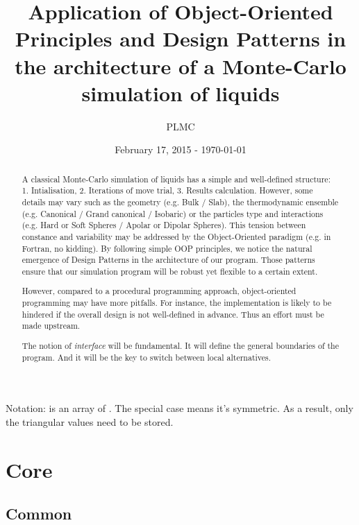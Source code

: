 \documentclass[a4paper, 12pt]{article}
\title{Application of Object-Oriented Principles and Design Patterns in the architecture of
    a Monte-Carlo simulation of liquids}
\author{PLMC}
\date{February 17, 2015 - \today{}}
\def\buildMode{buildmissing}
\begin{document}
    \maketitle

    \begin{abstract}
        A classical Monte-Carlo simulation of liquids has a simple and well-defined structure:
        1. Intialisation, 2. Iterations of move trial, 3. Results calculation.
        However, some details may vary such as the geometry (e.g. Bulk / Slab),
        the thermodynamic ensemble (e.g. Canonical / Grand canonical / Isobaric)
        or the particles type and interactions (e.g. Hard or Soft Spheres /
        Apolar or Dipolar Spheres).
        This tension between constance and variability may be addressed by
        the Object-Oriented paradigm (e.g. in Fortran, no kidding).
        By following simple OOP principles, we notice the natural emergence of Design Patterns
        in the architecture of our program.
        Those patterns ensure that our simulation program will be robust yet flexible
        to a certain extent.

        However, compared to a procedural programming approach, object-oriented programming
        may have more pitfalls.
        For instance, the implementation is likely to be hindered if the overall design is
        not well-defined in advance. Thus an effort must be made upstream.

        The notion of \emph{interface} will be fundamental. It will define the general boundaries of
        the program. And it will be the key to switch between local alternatives.
    \end{abstract}

    Notation:
     is an array of .
    The special case  means it's symmetric.
    As a result, only the triangular values need to be stored.

    \newpage
    \tableofcontents
    \clearpage

    \section{Core}

        \subsection{Common}
        \begin{figure}[htb]
            \centering
            
            \caption{}
        \end{figure}
\end{document}
